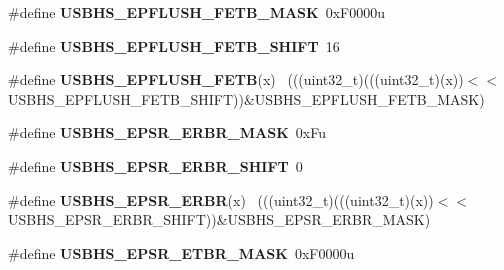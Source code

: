 \begin{DoxyCompactItemize}
\item 
\hypertarget{group___u_s_b_h_s___register___masks_ga4ea1adc1354c8041bcd6199d83d60a5f}{}\#define {\bfseries U\+S\+B\+H\+S\+\_\+\+E\+P\+F\+L\+U\+S\+H\+\_\+\+F\+E\+T\+B\+\_\+\+M\+A\+S\+K}~0x\+F0000u\label{group___u_s_b_h_s___register___masks_ga4ea1adc1354c8041bcd6199d83d60a5f}

\item 
\hypertarget{group___u_s_b_h_s___register___masks_ga8cee623a976b447ae742b0b334b8d91e}{}\#define {\bfseries U\+S\+B\+H\+S\+\_\+\+E\+P\+F\+L\+U\+S\+H\+\_\+\+F\+E\+T\+B\+\_\+\+S\+H\+I\+F\+T}~16\label{group___u_s_b_h_s___register___masks_ga8cee623a976b447ae742b0b334b8d91e}

\item 
\hypertarget{group___u_s_b_h_s___register___masks_ga1678e47ef7a5a82e0c097c0d029aac5f}{}\#define {\bfseries U\+S\+B\+H\+S\+\_\+\+E\+P\+F\+L\+U\+S\+H\+\_\+\+F\+E\+T\+B}(x)                                    ~(((uint32\+\_\+t)(((uint32\+\_\+t)(x))$<$$<$U\+S\+B\+H\+S\+\_\+\+E\+P\+F\+L\+U\+S\+H\+\_\+\+F\+E\+T\+B\+\_\+\+S\+H\+I\+F\+T))\&U\+S\+B\+H\+S\+\_\+\+E\+P\+F\+L\+U\+S\+H\+\_\+\+F\+E\+T\+B\+\_\+\+M\+A\+S\+K)\label{group___u_s_b_h_s___register___masks_ga1678e47ef7a5a82e0c097c0d029aac5f}

\item 
\hypertarget{group___u_s_b_h_s___register___masks_ga31b566d407c6692813d3be1ab774cf70}{}\#define {\bfseries U\+S\+B\+H\+S\+\_\+\+E\+P\+S\+R\+\_\+\+E\+R\+B\+R\+\_\+\+M\+A\+S\+K}~0x\+Fu\label{group___u_s_b_h_s___register___masks_ga31b566d407c6692813d3be1ab774cf70}

\item 
\hypertarget{group___u_s_b_h_s___register___masks_ga36c7d9b241777166cf827bbbad873e68}{}\#define {\bfseries U\+S\+B\+H\+S\+\_\+\+E\+P\+S\+R\+\_\+\+E\+R\+B\+R\+\_\+\+S\+H\+I\+F\+T}~0\label{group___u_s_b_h_s___register___masks_ga36c7d9b241777166cf827bbbad873e68}

\item 
\hypertarget{group___u_s_b_h_s___register___masks_gafb3114f7abc9238031fc492403446039}{}\#define {\bfseries U\+S\+B\+H\+S\+\_\+\+E\+P\+S\+R\+\_\+\+E\+R\+B\+R}(x)                                          ~(((uint32\+\_\+t)(((uint32\+\_\+t)(x))$<$$<$U\+S\+B\+H\+S\+\_\+\+E\+P\+S\+R\+\_\+\+E\+R\+B\+R\+\_\+\+S\+H\+I\+F\+T))\&U\+S\+B\+H\+S\+\_\+\+E\+P\+S\+R\+\_\+\+E\+R\+B\+R\+\_\+\+M\+A\+S\+K)\label{group___u_s_b_h_s___register___masks_gafb3114f7abc9238031fc492403446039}

\item 
\hypertarget{group___u_s_b_h_s___register___masks_ga3c89421a7b578ebe8e9ed7567092ba69}{}\#define {\bfseries U\+S\+B\+H\+S\+\_\+\+E\+P\+S\+R\+\_\+\+E\+T\+B\+R\+\_\+\+M\+A\+S\+K}~0x\+F0000u\label{group___u_s_b_h_s___register___masks_ga3c89421a7b578ebe8e9ed7567092ba69}


\end{DoxyCompactItemize}
